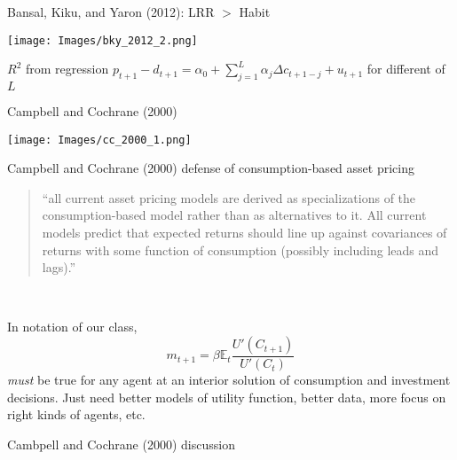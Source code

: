 \documentclass[xcolor=table, aspectratio=169]{beamer}
\newcommand{\E}{\mathbb{E}}
\begin{document}

\begin{frame}{Bansal, Kiku, and Yaron (2012): LRR $>$ Habit}
\begin{center}
\texttt{[image: Images/bky\_2012\_2.png]}
\end{center}
$R^2$ from regression $p_{t+1}-d_{t+1} = \alpha_0 + \sum_{j=1}^L \alpha_j \Delta c_{t+1-j} + u_{t+1}$ for different of $L$
\end{frame}


\begin{frame}{Campbell and Cochrane (2000)}
\begin{center}
\texttt{[image: Images/cc\_2000\_1.png]}
\end{center}
\end{frame}

\begin{frame}{Campbell and Cochrane (2000) defense of consumption-based asset pricing}
\begin{quote}
``all current asset pricing models are derived as specializations of the consumption-based model rather than as alternatives to it. All current models predict that expected returns should line up against covariances of returns with some function of consumption (possibly including leads and lags).''
\end{quote}

~ 

In notation of our class,
$$m_{t+1} = \beta \E_t \frac{U'(C_{t+1})}{U'(C_t)}$$
\textit{must} be true for any agent at an interior solution of consumption and investment decisions. Just need better models of utility function, better data, more focus on right kinds of agents, etc.
\end{frame}


\begin{frame}{Cambpell and Cochrane (2000) discussion}
    
\end{frame}
\end{document}
